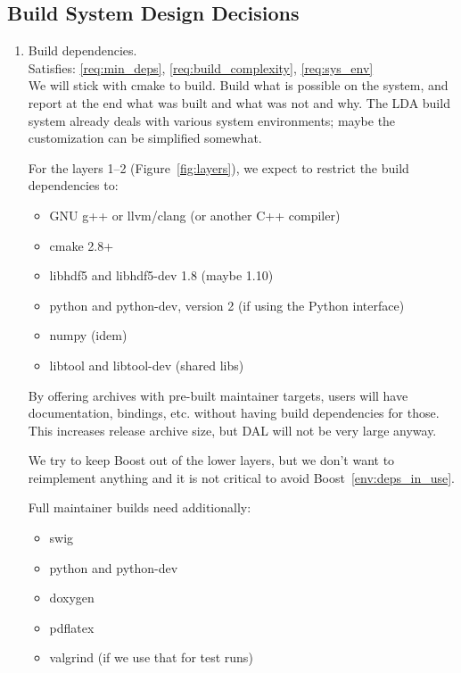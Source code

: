 \documentclass[a4paper,11pt]{article}
\begin{document}
\subsection{Build System Design Decisions} \label{sec:build_sys_design_decisions}

\begin{enumerate}[resume, label=\it D.\arabic{*}]
\itemsep0em

\item \label{dsg:min_deps} Build dependencies.\\
Satisfies: \ref{req:min_deps}, \ref{req:build_complexity}, \ref{req:sys_env}\\

We will stick with cmake to build.
Build what is possible on the system, and report at the end what was built and what was not and why.
The LDA build system already deals with various system environments; maybe the customization can be simplified somewhat.

For the layers 1--2 (Figure~\ref{fig:layers}), we expect to restrict the build dependencies to:
\begin{itemize}
\itemsep0em
\item GNU g++ or llvm/clang (or another C++ compiler)
\item cmake 2.8+
\item libhdf5 and libhdf5-dev 1.8 (maybe 1.10)
\item python and python-dev, version 2 (if using the Python interface)
\item numpy (idem)
\item libtool and libtool-dev (shared libs)
\end{itemize}
By offering archives with pre-built maintainer targets, users will have documentation, bindings, etc. without having build dependencies for those.
This increases release archive size, but DAL will not be very large anyway.

We try to keep Boost out of the lower layers, but we don't want to reimplement anything and it is not critical to avoid Boost~\ref{env:deps_in_use}.

Full maintainer builds need additionally:
\begin{itemize}
\itemsep0em
\item swig
\item python and python-dev
\item doxygen
\item pdflatex
\item valgrind (if we use that for test runs)
\end{itemize}


\end{enumerate}
\end{document}
